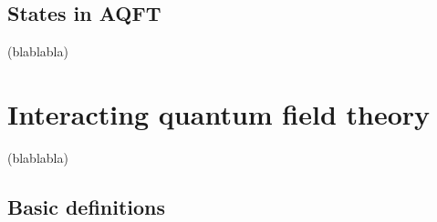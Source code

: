 \documentclass[10pt]{book}
\theoremstyle{break}
\begin{document}
\section{States in AQFT}


(blablabla)


\chapter{Interacting quantum field theory}


(blablabla)


\section{Basic definitions}
\end{document}
